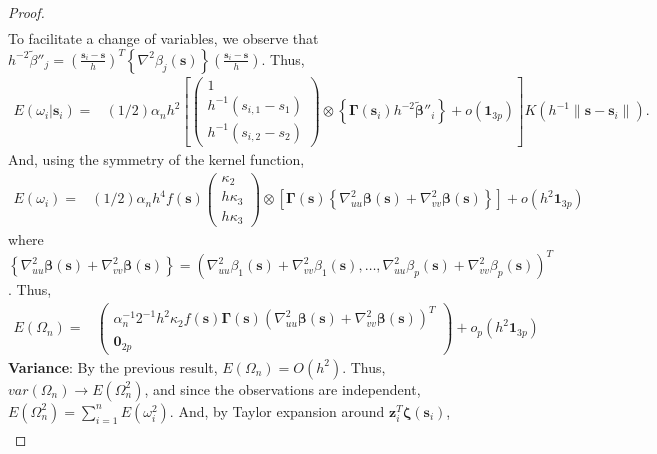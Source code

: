 \documentclass[authoryear,review, 12pt]{elsarticle}
\begin{document}
\begin{proof}
\begin{align*}
\end{align*}
To facilitate a change of variables, we observe that $h^{-2}\tilde{\beta}''_{j}=\left(\frac{\bm{s}_{i}-\bm{s}}{h}\right)^{T}\left\{ \nabla^{2}\beta_{j}(\bm{s})\right\} \left(\frac{\bm{s}_{i}-\bm{s}}{h}\right)$.
Thus,
\begin{align*}
E\left(\omega_{i}|\bm{s}_{i}\right)= & \left(1/2\right)\alpha_{n}h^{2}\left[\left(\begin{array}{c}
1\\
h^{-1}(s_{i,1}-s_{1})\\
h^{-1}(s_{i,2}-s_{2})
\end{array}\right)\otimes\left\{ \bm{\Gamma}(\bm{s}_{i})h^{-2}\tilde{\bm{\beta}}''_{i}\right\} +o\left(\bm{1}_{3p}\right)\right]K\left(h^{-1}\|\bm{s}-\bm{s}_{i}\|\right).
\end{align*}
And, using the symmetry of the kernel function,
\begin{align*}
E\left(\omega_{i}\right)= & (1/2)\alpha_{n}h^{4}f(\bm{s})\left(\begin{array}{c}
\kappa_{2}\\
h\kappa_{3}\\
h\kappa_{3}
\end{array}\right)\otimes\left[\bm{\Gamma}(\bm{s})\left\{ \nabla_{uu}^{2}\bm{\beta}(\bm{s})+\nabla_{vv}^{2}\bm{\beta}(\bm{s})\right\} \right]+o\left(h^{2}\bm{1}_{3p}\right)
\end{align*}
where $\left\{ \nabla_{uu}^{2}\bm{\beta}(\bm{s})+\nabla_{vv}^{2}\bm{\beta}(\bm{s})\right\} =\left(\nabla_{uu}^{2}\beta_{1}(\bm{s})+\nabla_{vv}^{2}\beta_{1}(\bm{s}),\dots,\nabla_{uu}^{2}\beta_{p}(\bm{s})+\nabla_{vv}^{2}\beta_{p}(\bm{s})\right)^{T}$.
Thus,
\begin{align*}
E\left(\Omega_{n}\right)= & \left(\begin{array}{c}
\alpha_{n}^{-1}2^{-1}h^{2}\kappa_{2}f(\bm{s})\bm{\Gamma}(\bm{s})\left(\nabla_{uu}^{2}\bm{\beta}(\bm{s})+\nabla_{vv}^{2}\bm{\beta}(\bm{s})\right)^{T}\\
\bm{0}_{2p}
\end{array}\right)+o_{p}\left(h^{2}\bm{1}_{3p}\right)
\end{align*}
\textbf{Variance}: By the previous result, $E\left(\Omega_{n}\right)=O\left(h^{2}\right)$.
Thus, $var\left(\Omega_{n}\right)\to E\left(\Omega_{n}^{2}\right)$,
and since the observations are independent, $E\left(\Omega_{n}^{2}\right)=\sum_{i=1}^{n}E\left(\omega_{i}^{2}\right)$.
And, by Taylor expansion around $\bm{z}_{i}^{T}\bm{\zeta}(\bm{s}_{i})$, 
\begin{align*}

\end{align*}
\end{proof}
\end{document}
